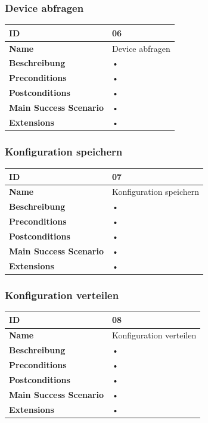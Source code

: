 \subsubsection{Device abfragen}
\mbox{}
\begin{longtable}{| p{4cm} | p{11.7cm} |}
 \hline
 \textbf{ID} & 06\\ \hline 
 \textbf{Name} & Device abfragen\\ \hline 
 \textbf{Beschreibung} & • \\ \hline 
 \textbf{Preconditions} & • \\ \hline 
 \textbf{Postconditions} & • \\ \hline 
 \textbf{Main Success Scenario} & • \\ \hline 
 \textbf{Extensions} & • \\ \hline 
 \end{longtable}
 
\subsubsection{Konfiguration speichern}
\mbox{}
\begin{longtable}{| p{4cm} | p{11.7cm} |}
 \hline
 \textbf{ID} & 07\\ \hline 
 \textbf{Name} & Konfiguration speichern\\ \hline 
 \textbf{Beschreibung} & • \\ \hline 
 \textbf{Preconditions} & • \\ \hline 
 \textbf{Postconditions} & • \\ \hline 
 \textbf{Main Success Scenario} & • \\ \hline 
 \textbf{Extensions} & • \\ \hline 
 \end{longtable}
 
\subsubsection{Konfiguration verteilen}
\mbox{}
\begin{longtable}{| p{4cm} | p{11.7cm} |}
 \hline
 \textbf{ID} & 08\\ \hline 
 \textbf{Name} & Konfiguration verteilen\\ \hline 
 \textbf{Beschreibung} & • \\ \hline 
 \textbf{Preconditions} & • \\ \hline 
 \textbf{Postconditions} & • \\ \hline 
 \textbf{Main Success Scenario} & • \\ \hline 
 \textbf{Extensions} & • \\ \hline 
 \end{longtable}
 

